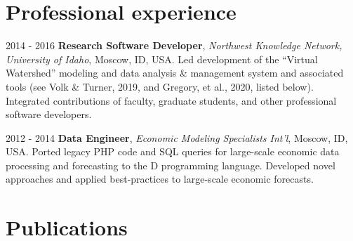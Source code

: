 \documentclass[letterpaper,11pt,oneside]{article}
\begin{document}
\noindent
\section*{\textcolor{gunmetal}{Professional experience}}

  \begin{hangparas}{0.25in}{1}
    2014 - 2016 \hspace{-0.555em} \quad\textbf{Research Software Developer}, 
        \emph{Northwest Knowledge Network, University of Idaho}, Moscow, ID, USA. Led development of the ``Virtual Watershed'' modeling and data analysis \&
        management system and associated tools (see Volk \& Turner, 2019, and 
        Gregory, et al., 2020, listed below). 
        Integrated contributions of faculty, graduate students,
        and other professional software developers.

      2012 - 2014 \quad \textbf{Data Engineer}, 
      \emph{Economic Modeling Specialists Int'l}, Moscow, ID, USA.
      Ported legacy PHP code and SQL queries for large-scale 
      economic data processing
      and forecasting to the D programming language. 
      Developed novel approaches and applied best-practices to large-scale
      economic forecasts.

  \end{hangparas}

\noindent


\noindent
\section*{\textcolor{gunmetal}{Publications}}
\end{document}
